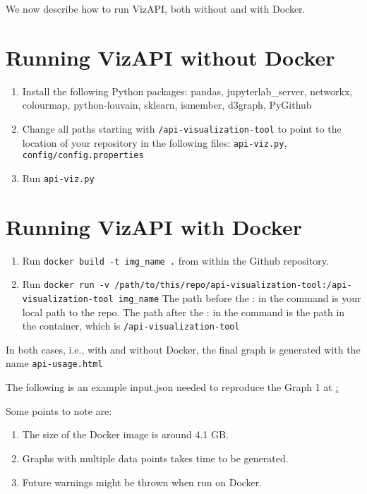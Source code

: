 \documentclass[conference]{IEEEtran}
\begin{document}
We now describe how to run VizAPI, both without and with Docker.
\begin{sloppypar}
\section{Running VizAPI without Docker}
\begin{enumerate}
\item Install the following Python packages: pandas, jupyterlab\_server, networkx, colourmap, python-louvain, sklearn, ismember, d3graph, PyGithub
\item Change all paths starting with \texttt{/api-visualization-tool} to point to the location of your repository in the following files: \texttt{api-viz.py}, \texttt{config/config.properties}
\item Run \texttt{api-viz.py}
\end{enumerate}

\section{Running VizAPI with Docker}
\begin{enumerate}
\item Run \texttt{docker build -t img\_name .} from within the Github repository.
\item Run \texttt{docker run -v /path/to/this/repo/api-visualization-tool:/api-visualization-tool img\_name} The path before the : in the command is your local path to the repo. The path after the : in the command is the path in the container, which is \texttt{/api-visualization-tool}
\end{enumerate}
\end{sloppypar}
In both cases, i.e., with and without Docker, the final graph is generated with the name \texttt{api-usage.html}

The following is an example input.json needed to reproduce the Graph 1 at \href{https://sruthivenkat.github.io/VizAPI-graph/}:


Some points to note are:
\begin{enumerate}
\item The size of the Docker image is around 4.1 GB.
\item Graphs with multiple data points takes time to be generated.
\item Future warnings might be thrown when run on Docker.
\end{enumerate}
\end{document}
